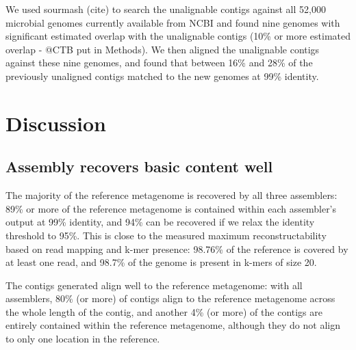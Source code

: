 \documentclass[10pt,a4paper,twocolumn]{article}
\begin{document}


We used sourmash (cite) to search the unalignable contigs against all
52,000 microbial genomes currently available from NCBI and found nine
genomes with significant estimated overlap with the unalignable contigs
(10\% or more estimated overlap - @CTB put in Methods).  We then
aligned the unalignable contigs against these nine genomes, and found
that between 16\% and 28\% of the previously unaligned contigs matched
to the new genomes at 99\% identity.


\section*{Discussion}
\subsection*{Assembly recovers basic content well}

The majority of the reference metagenome is recovered by all three
assemblers: 89\% or more of the reference metagenome is contained
within each assembler’s output at 99\% identity, and 94\% can be
recovered if we relax the identity threshold to 95\%.  This is close
to the measured maximum reconstructability based on read mapping and
k-mer presence: 98.76\% of the reference is covered by at least one
read, and 98.7\% of the genome is present in k-mers of size 20.

The contigs generated align well to the reference metagenome: with all assemblers, 80\% (or
more) of contigs align to the reference metagenome across the whole
length of the contig, and another 4\% (or more) of the contigs are
entirely contained within the reference metagenome, although they do
not align to only one location in the reference.
\end{document}

